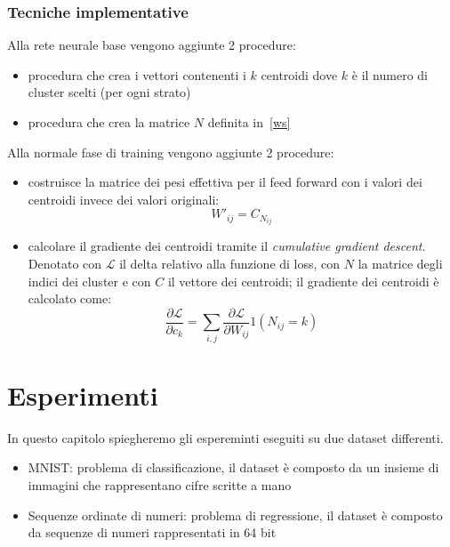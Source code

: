 \documentclass[11pt,a4paper,twoside,
openright]{book}
\begin{document}
\subsection{Tecniche implementative}
Alla rete neurale base vengono aggiunte 2 procedure:
\begin{itemize}
\item procedura che crea i vettori contenenti i $k$ centroidi dove $k$ è il numero di cluster scelti (per ogni strato)
\item procedura che crea la matrice $N$ definita in~\eqref{ws}
\end{itemize}
Alla normale fase di training vengono aggiunte 2 procedure:
\begin{itemize}
\item costruisce la matrice dei pesi effettiva per il feed forward con i valori dei centroidi invece dei valori originali:
\begin{equation}
W'_{ij} = C_{N_{ij}}
\label{wprimo}
\end{equation}
\item calcolare il gradiente dei centroidi tramite il \textit{cumulative gradient descent}. Denotato con $\mathcal{L}$ il delta relativo alla funzione di loss, con $N$ la matrice degli indici dei cluster e con $C$ il vettore dei centroidi; il gradiente dei centroidi è calcolato come:
\begin{equation}
\frac{\partial \mathcal{L}}{\partial c_{k}}=\sum\limits_{i,j}\frac{\partial \mathcal{L}}{\partial W_{ij}}1(N_{ij}=k)
\label{gradientews}
\end{equation}


\end{itemize}


\chapter{Esperimenti}
In questo capitolo spiegheremo gli espereminti eseguiti su due dataset differenti.
\begin{itemize}
\item MNIST: problema di classificazione, il dataset è composto da un insieme di immagini che rappresentano cifre scritte a mano
\item Sequenze ordinate di numeri: problema di regressione, il dataset è composto da sequenze di numeri rappresentati in 64 bit
\end{itemize}
\end{document}
